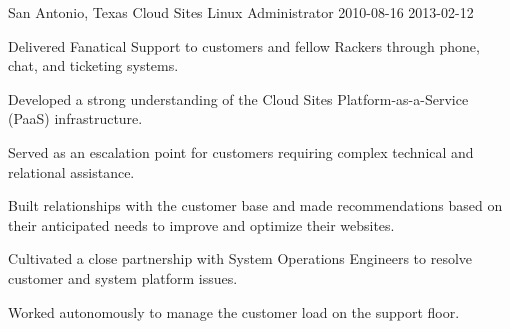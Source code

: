 \begin{role}
{\companyrackspace}
{San Antonio, Texas}
{Cloud Sites Linux Administrator }
{2010-08-16}
{2013-02-12}
    \item Delivered Fanatical Support to customers and fellow Rackers through phone, chat, and ticketing systems.
    \item Developed a strong understanding of the Cloud Sites Platform-as-a-Service (PaaS) infrastructure.
    \item Served as an escalation point for customers requiring complex technical and relational assistance.
    \item Built relationships with the customer base and made recommendations based on their anticipated needs to improve and optimize their websites.
    \item Cultivated a close partnership with System Operations Engineers to resolve customer and system platform issues.
    \item Worked autonomously to manage the customer load on the support floor.
\end{role}

